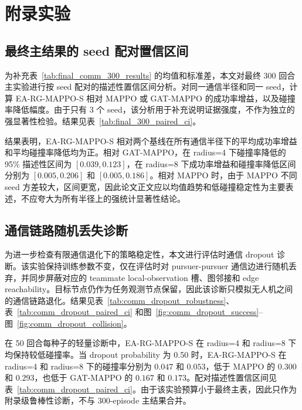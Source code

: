 \appendix
\section{附录实验}

\subsection{最终主结果的 seed 配对置信区间}

为补充表~\ref{tab:final_comm_300_results} 的均值和标准差，本文对最终 300 回合主实验进行按 seed 配对的描述性置信区间分析。对同一通信半径和同一 seed，计算 EA-RG-MAPPO-S 相对 MAPPO 或 GAT-MAPPO 的成功率增益，以及碰撞率降低幅度。由于只有 3 个 seed，该分析用于补充说明证据强度，不作为独立的强显著性检验。结果见表~\ref{tab:final_300_paired_ci}。



结果表明，EA-RG-MAPPO-S 相对两个基线在所有通信半径下的平均成功率增益和平均碰撞率降低均为正。相对 GAT-MAPPO，在 radius=4 下碰撞率降低的 95\% 描述性区间为 $[0.039,0.123]$，在 radius=8 下成功率增益和碰撞率降低区间分别为 $[0.005,0.206]$ 和 $[0.005,0.186]$。相对 MAPPO 时，由于 MAPPO 不同 seed 方差较大，区间更宽，因此论文正文应以均值趋势和低碰撞稳定性为主要表述，不应夸大为所有半径上的强统计显著性结论。

\subsection{通信链路随机丢失诊断}

为进一步检查有限通信退化下的策略稳定性，本文进行评估时通信 dropout 诊断。该实验保持训练参数不变，仅在评估时对 pursuer-pursuer 通信边进行随机丢弃，并同步屏蔽对应的 teammate local-observation 槽、图邻接和 edge reachability。目标节点仍作为任务观测节点保留，因此该诊断只模拟无人机之间的通信链路退化。结果见表~\ref{tab:comm_dropout_robustness}、表~\ref{tab:comm_dropout_paired_ci} 和图~\ref{fig:comm_dropout_success}--图~\ref{fig:comm_dropout_collision}。



在 50 回合每种子的轻量诊断中，EA-RG-MAPPO-S 在 radius=4 和 radius=8 下均保持较低碰撞率。当 dropout probability 为 0.50 时，EA-RG-MAPPO-S 在 radius=4 和 radius=8 下的碰撞率分别为 $0.047$ 和 $0.053$，低于 MAPPO 的 $0.300$ 和 $0.293$，也低于 GAT-MAPPO 的 $0.167$ 和 $0.173$。配对描述性置信区间见表~\ref{tab:comm_dropout_paired_ci}。由于该实验预算小于最终主表，因此只作为附录级鲁棒性诊断，不与 300-episode 主结果合并。

